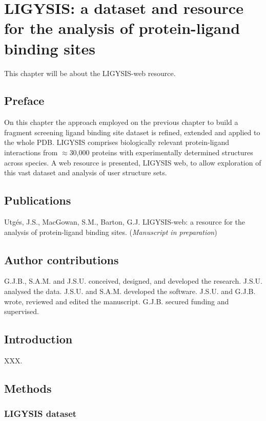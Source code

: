 \chapter{LIGYSIS: a dataset and resource for the analysis of protein-ligand binding sites}

This chapter will be about the LIGYSIS-web resource.

\section*{Preface}

On this chapter the approach employed on the previous chapter to build a fragment screening ligand binding site dataset is refined, extended and applied to the whole PDB. LIGYSIS comprises biologically relevant protein-ligand interactions from $\approx$30,000 proteins with experimentally determined structures across species. A web resource is presented, LIGYSIS web, to allow exploration of this vast dataset and analysis of user structure sets.

\section*{Publications}

Utgés, J.S., MacGowan, S.M., Barton, G.J. LIGYSIS-web: a resource for the analysis of protein-ligand binding sites. (\textit{Manuscript in preparation})

\section*{Author contributions}

G.J.B., S.A.M. and J.S.U. conceived, designed, and developed the research. J.S.U. analysed the data. J.S.U. and S.A.M. developed the software. J.S.U. and G.J.B. wrote, reviewed and edited the manuscript. G.J.B. secured funding and supervised.

\section{Introduction}

XXX.

\section{Methods}

\subsection{LIGYSIS dataset}

